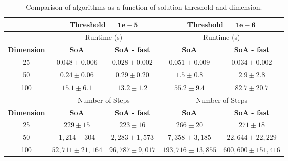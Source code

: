 \begin{table}[]
  \caption{Comparison of algorithms as a function of solution threshold and
    dimension.}
  \label{tab:threshold}
\begin{tabular}{ccc|cc}\toprule
                                  & \multicolumn{2}{c|}{\textbf{Threshold} $\mathbf{ =
                                    1e-5}$}                         &
                                                                      \multicolumn{2}{|c}{
                                                                     \textbf{Threshold}
                                                                      $\mathbf{ = 1e-6}$}                                          \\\midrule
                   & \multicolumn{2}{c|}{Runtime (s)} &
                                                       \multicolumn{2}{c}{Runtime (s)}\\\midrule
  \textbf{Dimension} & \textbf{SoA} & \textbf{SoA - fast} & \textbf{SoA} & \textbf{SoA - fast}\\
             25              & $0.048 \pm 0.006$   & $0.028 \pm 0.002$  & $0.051 \pm 0.009$    & $0.034 \pm 0.002$   \\
             50             & $0.24 \pm 0.06$     & $0.29 \pm 0.20$    & $1.5 \pm 0.8$        & $2.9 \pm 2.8$       \\
             100         & $15.1 \pm 6.1$      & $13.2 \pm 1.2$     & $55.2 \pm 9.4$       & $82.7 \pm 20.7$    \\\midrule
              & \multicolumn{2}{c|}{Number of Steps} & \multicolumn{2}{c}{Number
                                                      of Steps}\\\midrule
  \textbf{Dimension} & \textbf{SoA} & \textbf{SoA - fast} & \textbf{SoA} & \textbf{SoA - fast}\\
              25        & $229 \pm 15$        & $223 \pm 16$       & $266 \pm 20$         & $271 \pm 18$        \\
             50        & $1,214 \pm 304$     & $2,283 \pm 1,573$   & $7,358 \pm 3,185$    & $22,644 \pm 22,229$ \\
             100       & $52,711 \pm 21,164$ & $96,787 \pm 9,017$ & $193,716 \pm
                                                                    13,855$ &
                                                                              $600,600
                                                                              \pm
  151,416$ \\\bottomrule
\end{tabular}
\end{table}

